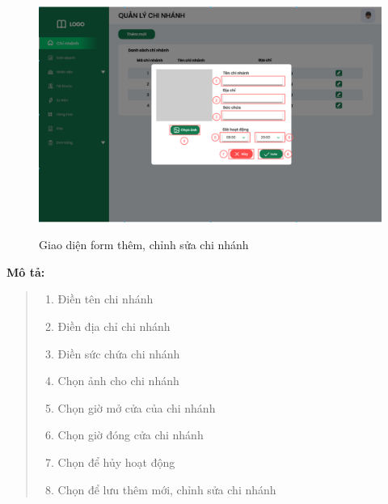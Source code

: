                \begin{figure}[!htp]
                    \centering
                    \includegraphics[width=12cm]{img/UI/admin/branch_add-edit.png}
                    \label{20}
                    \newline
                    \caption{Giao diện form thêm, chỉnh sửa chi nhánh}
                \end{figure}
                \textbf{Mô tả:}  
                \begin{quote}
                    \begin{enumerate}
                        \item Điền tên chi nhánh
                        \item Điền địa chỉ chi nhánh
                        \item Điền sức chứa chi nhánh
                        \item Chọn ảnh cho chi nhánh
                        \item Chọn giờ mở cửa của chi nhánh
                        \item Chọn giờ đóng cửa chi nhánh
                        \item Chọn để hủy hoạt động
                        \item Chọn để lưu thêm mới, chỉnh sửa chi nhánh
                    \end{enumerate}
                \end{quote}
        
